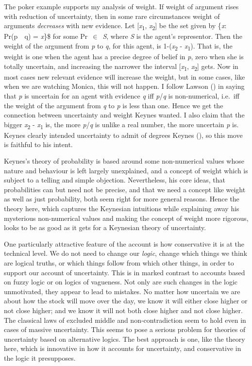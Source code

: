 \documentclass[
  10pt,
  letterpaper,
  DIV=11,
  numbers=noendperiod,
  twoside]{scrartcl}
\begin{document}
The poker example supports my analysis of weight. If weight of argument
rises with reduction of uncertainty, then in some rare circumstances
weight of arguments \emph{decreases} with new evidence. Let
{[}\emph{x}\textsubscript{1}, \emph{x}\textsubscript{2}{]} be the set
given by \{\emph{x}: Pr(p\emph{~\textbar~}q) = \emph{x}\}\$ for some
Pr~\(\in\)~\emph{S}, where \emph{S} is the agent's representor. Then the
weight of the argument from \emph{p} to \emph{q}, for this agent, is
1-(\emph{x}\textsubscript{2} - \emph{x}\textsubscript{1}). That is, the
weight is one when the agent has a precise degree of belief in \emph{p},
zero when she is totally uncertain, and increasing the narrower the
interval {[}\emph{x}\textsubscript{1}, \emph{x}\textsubscript{2}{]}
gets. Now in most cases new relevant evidence will increase the weight,
but in some cases, like when we are watching Monica, this will not
happen. I follow Lawson () in saying that
\emph{p} is uncertain for an agent with evidence \emph{q} iff
\emph{p}/\emph{q} is non-numerical, i.e.~iff the weight of the argument
from \emph{q} to \emph{p} is less than one. Hence we get the connection
between uncertainty and weight Keynes wanted. I also claim that the
bigger \emph{x}\textsubscript{2} - \emph{x}\textsubscript{1} is, the
more \emph{p}/\emph{q} is unlike a real number, the more uncertain
\emph{p} is. Keynes clearly intended uncertainty to admit of degrees
Keynes (), so this move is faithful to
his intent.

Keynes's theory of probability is based around some non-numerical values
whose nature and behaviour is left largely unexplained, and a concept of
weight which is subject to a telling and simple objection. Nevertheless,
his core ideas, that probabilities can but need not be precise, and that
we need a concept like weight as well as just probability, both seem
right for more general reasons. Hence the theory here, which captures
the Keynesian intuitions while explaining away his mysterious
non-numerical values and making the concept of weight more rigorous,
looks to be as good as it gets for a Keynesian theory of uncertainty.

One particularly attractive feature of the account is how conservative
it is at the technical level. We do not need to change our \emph{logic},
change which things we think are logical truths, or which things follow
from which other things, in order to support our account of uncertainty.
This is in marked contrast to accounts based on fuzzy logic or on logics
of vagueness. Not only are such changes in the logic unmotivated, they
appear to lead to mistakes. No matter how uncertain we are about how the
stock will move over the day, we know it will either close higher or not
close higher; and we know it will not both close higher and not close
higher. The classical laws of excluded middle and non-contradiction seem
to hold even in cases of massive uncertainty. This seems to pose a
serious problem for theories of uncertainty based on alternative logics.
The best approach is one, like the theory here, which is innovative in
how it accounts for uncertainty, and conservative in the logic it
presupposes.
\end{document}
